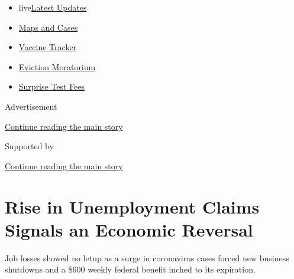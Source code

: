 \begin{itemize}
\tightlist
\item
  live\href{https://www.nytimes3xbfgragh.onion/2020/09/09/world/covid-19-coronavirus.html?name=styln-coronavirus-markets\&region=TOP_BANNER\&block=storyline_menu_recirc\&action=click\&pgtype=Article\&impression_id=6ef32bd0-f2a4-11ea-9fa3-9f633d681c3c\&variant=undefined}{Latest
  Updates}
\item
  \href{https://www.nytimes3xbfgragh.onion/interactive/2020/us/coronavirus-us-cases.html?name=styln-coronavirus-markets\&region=TOP_BANNER\&block=storyline_menu_recirc\&action=click\&pgtype=Article\&impression_id=6ef32bd1-f2a4-11ea-9fa3-9f633d681c3c\&variant=undefined}{Maps
  and Cases}
\item
  \href{https://www.nytimes3xbfgragh.onion/interactive/2020/science/coronavirus-vaccine-tracker.html?name=styln-coronavirus-markets\&region=TOP_BANNER\&block=storyline_menu_recirc\&action=click\&pgtype=Article\&impression_id=6ef32bd2-f2a4-11ea-9fa3-9f633d681c3c\&variant=undefined}{Vaccine
  Tracker}
\item
  \href{https://www.nytimes3xbfgragh.onion/2020/09/02/your-money/eviction-moratorium-covid.html?name=styln-coronavirus-markets\&region=TOP_BANNER\&block=storyline_menu_recirc\&action=click\&pgtype=Article\&impression_id=6ef32bd3-f2a4-11ea-9fa3-9f633d681c3c\&variant=undefined}{Eviction
  Moratorium}
\item
  \href{https://www.nytimes3xbfgragh.onion/2020/09/09/upshot/coronavirus-surprise-test-fees.html?name=styln-coronavirus-markets\&region=TOP_BANNER\&block=storyline_menu_recirc\&action=click\&pgtype=Article\&impression_id=6ef32bd4-f2a4-11ea-9fa3-9f633d681c3c\&variant=undefined}{Surprise
  Test Fees}
\end{itemize}

Advertisement

\protect\hyperlink{after-top}{Continue reading the main story}

Supported by

\protect\hyperlink{after-sponsor}{Continue reading the main story}

\hypertarget{rise-in-unemployment-claims-signals-an-economic-reversal}{%
\section{Rise in Unemployment Claims Signals an Economic
Reversal}\label{rise-in-unemployment-claims-signals-an-economic-reversal}}

Job losses showed no letup as a surge in coronavirus cases forced new
business shutdowns and a \$600 weekly federal benefit inched to its
expiration.

